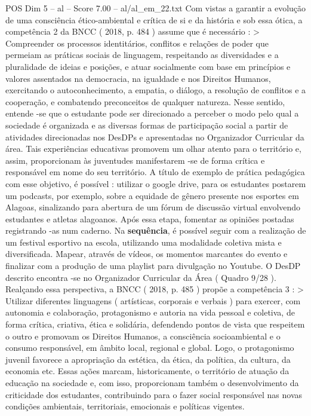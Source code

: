 \begin{textsample}{POS Dim 5 – al – Score 7.00 – al/al\_em\_22.txt}
Com vistas a garantir a evolução de uma consciência ético-ambiental e crítica de si e da história e sob essa ótica, a competência 2 da BNCC ( 2018, p. 484 ) assume que é necessário : > Compreender os processos identitários, conflitos e relações de poder que permeiam as práticas sociais de linguagem, respeitando as diversidades e a pluralidade de ideias e posições, e atuar socialmente com base em princípios e valores assentados na democracia, na igualdade e nos Direitos Humanos, exercitando o autoconhecimento, a empatia, o diálogo, a resolução de conflitos e a cooperação, e combatendo preconceitos de qualquer natureza.
Nesse sentido, entende -se que o estudante pode ser direcionado a perceber o modo pelo qual a sociedade é organizada e as diversas formas de participação social a partir de atividades direcionadas nos DesDPs e apresentadas no Organizador Curricular da área.
Tais experiências educativas promovem um olhar atento para o território e, assim, proporcionam às juventudes manifestarem -se de forma crítica e responsável em nome do seu território.
A título de exemplo de prática pedagógica com esse objetivo, é possível : utilizar o google drive, para os estudantes postarem um podcasts, por exemplo, sobre a equidade de gênero presente nos esportes em Alagoas, sinalizando para abertura de um fórum de discussão virtual envolvendo estudantes e atletas alagoanos.
Após essa etapa, fomentar as opiniões postadas registrando -as num caderno.
Na \textbf{sequência}, é possível seguir com a realização de um festival esportivo na escola, utilizando uma modalidade coletiva mista e diversificada.
Mapear, através de vídeos, os momentos marcantes do evento e finalizar com a produção de uma playlist para divulgação no Youtube.
O DesDP descrito encontra -se no Organizador Curricular da Área ( Quadro 9/28 ).
Realçando essa perspectiva, a BNCC ( 2018, p. 485 ) propõe a competência 3 : > Utilizar diferentes linguagens ( artísticas, corporais e verbais ) para exercer, com autonomia e colaboração, protagonismo e autoria na vida pessoal e coletiva, de forma crítica, criativa, ética e solidária, defendendo pontos de vista que respeitem o outro e promovam os Direitos Humanos, a consciência socioambiental e o consumo responsável, em âmbito local, regional e global.
Logo, o protagonismo juvenil favorece a apropriação da estética, da ética, da política, da cultura, da economia etc.
Essas ações marcam, historicamente, o território de atuação da educação na sociedade e, com isso, proporcionam também o desenvolvimento da criticidade dos estudantes, contribuindo para o fazer social responsável nas novas condições ambientais, territoriais, emocionais e políticas vigentes.

\end{textsample}
